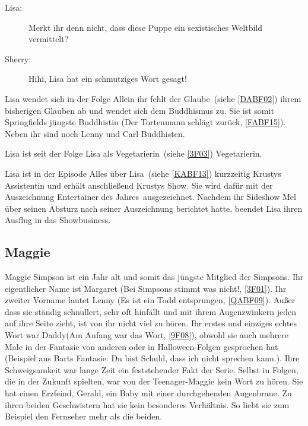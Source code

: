 \begin{description}
	\item[Lisa:] \glqq Merkt ihr denn nicht, dass diese Puppe ein sexistisches Weltbild vermittelt?\grqq
	\item[Sherry:] \glqq Hihi, Lisa hat ein schmutziges Wort gesagt!\grqq\
\end{description}

Lisa wendet sich in der Folge \glqq Allein ihr fehlt der Glaube\grqq\ (siehe \ref{DABF02}) ihrem bisherigen Glauben ab und wendet sich dem Buddhismus zu. Sie ist somit Springfields jüngste Buddhistin (\glqq Der Tortenmann schlägt zurück\grqq , \ref{FABF15}). Neben ihr sind noch Lenny und Carl Buddhisten.

Lisa ist seit der Folge \glqq Lisa als Vegetarierin\grqq\ (siehe \ref{3F03}) Vegetarierin.

Lisa ist in der Episode \glqq Alles über Lisa\grqq\ (siehe \ref{KABF13}) kurzzeitig Krustys Assistentin und erhält anschließend Krustys Show. Sie wird dafür mit der Auszeichnung \glqq Entertainer des Jahres\grqq\ ausgezeichnet. Nachdem ihr Sideshow Mel über seinen Absturz nach seiner Auszeichnung berichtet hatte, beendet Lisa ihren Ausflug in das Showbusiness.


\subsection{Maggie}\label{MaggieSimpson}
Maggie Simpson ist ein Jahr alt und somit das jüngste Mitglied der Simpsons. Ihr eigentlicher Name ist Margaret (\glqq Bei Simpsons stimmt was nicht!\grqq , \ref{3F01}). Ihr zweiter Vorname lautet Lenny (\glqq Es ist ein Todd entsprungen\grqq, \ref{QABF09}). Außer dass sie ständig schnullert, sehr oft hinfällt und mit ihrem Augenzwinkern jeden auf ihre Seite zieht, ist von ihr nicht viel zu hören. Ihr erstes und einziges echtes Wort war \glqq Daddy\grqq (\glqq Am Anfang war das Wort\grqq , \ref{9F08}), obwohl sie auch mehrere Male in der Fantasie von anderen oder in Halloween-Folgen gesprochen hat (Beispiel aus Barts Fantasie: \glqq Du bist Schuld, dass ich nicht sprechen kann.\grqq ). Ihre Schweigsamkeit war lange Zeit ein feststehender Fakt der Serie. Selbst in Folgen, die in der Zukunft spielten, war von der Teenager-Maggie kein Wort zu hören. Sie hat einen Erzfeind, Gerald, ein Baby mit einer durchgehenden Augenbraue. Zu ihren beiden Geschwistern hat sie kein besonderes Verhältnis. So liebt sie zum Beispiel den Fernseher mehr als die beiden.

